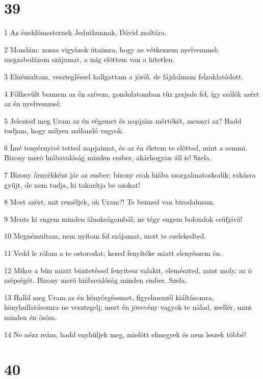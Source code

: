 \chapter{39}

\par 1 Az éneklõmesternek Jeduthunnak, Dávid zsoltára.
\par 2 Mondám: nosza vigyázok útaimra, hogy ne vétkezzem nyelvemmel; megzabolázom szájamat, a míg elõttem van a hitetlen.
\par 3 Elnémultam, vesztegléssel hallgattam a jóról, de fájdalmam felzaklatódott.
\par 4 Fölhevült bennem az én szívem, gondolatomban tûz gerjede fel, így szólék azért az én nyelvemmel:
\par 5 Jelentsd meg Uram az én végemet és napjaim mértékét, mennyi az? Hadd tudjam, hogy milyen múlandó vagyok.
\par 6 Ímé tenyérnyivé tetted napjaimat, és az én életem te elõtted, mint a semmi. Bizony merõ hiábavalóság minden ember, akárhogyan áll is! Szela.
\par 7 Bizony árnyékként jár az ember; bizony csak hiába szorgalmatoskodik; rakásra gyûjt, de nem tudja, ki takarítja be azokat!
\par 8 Most azért, mit reméljek, oh Uram?! Te benned van bizodalmam.
\par 9 Ments ki engem minden álnokságomból; ne tégy engem bolondok csúfjává!
\par 10 Megnémultam, nem nyitom fel szájamat, mert te cselekedted.
\par 11 Vedd le rólam a te ostorodat; kezed fenyítéke miatt elenyészem én.
\par 12 Mikor a bûn miatt büntetéssel fenyítesz valakit, elemészted, mint moly, az õ szépségét. Bizony merõ hiábavalóság minden ember. Szela.
\par 13 Halld meg Uram az én könyörgésemet, figyelmezzél kiáltásomra, könyhullatásomra ne vesztegelj; mert én jövevény vagyok te nálad, zsellér, mint minden én õsöm.
\par 14 Ne nézz reám, hadd enyhüljek meg, mielõtt elmegyek és nem leszek többé!

\chapter{40}

